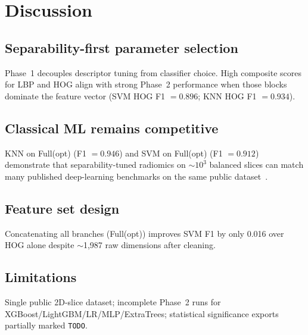 \section{Discussion}
\label{sec:discussion}

\subsection{Separability-first parameter selection}
Phase~1 decouples descriptor tuning from classifier choice.
High composite scores for LBP and HOG align with strong Phase~2 performance when those blocks dominate the feature vector (SVM HOG F1 $=0.896$; KNN HOG F1 $=0.934$).

\subsection{Classical ML remains competitive}
KNN on Full(opt) (F1 $=0.946$) and SVM on Full(opt) (F1 $=0.912$) demonstrate that separability-tuned radiomics on $\sim10^3$ balanced slices can match many published deep-learning benchmarks on the same public dataset~\cite{ref_access20253579727,ref_iasc2023032426,ref_s41598024772437}.

\subsection{Feature set design}
Concatenating all branches (Full(opt)) improves SVM F1 by only 0.016 over HOG alone despite $\sim$1{,}987 raw dimensions after cleaning.

\subsection{Limitations}
Single public 2D-slice dataset; incomplete Phase~2 runs for XGBoost/LightGBM/LR/MLP/ExtraTrees; statistical significance exports partially marked \texttt{TODO}.
